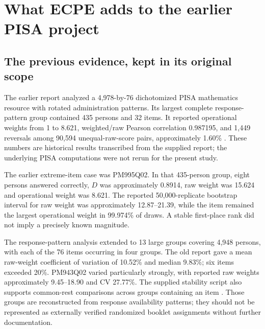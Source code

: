 \documentclass[11pt,a4paper,oneside,headings=normal,parskip=half]{scrreprt}
\begin{document}
\chapter{What ECPE adds to the earlier PISA project}
\section{The previous evidence, kept in its original scope}
The earlier report analyzed a 4,978-by-76 dichotomized PISA mathematics resource with rotated administration patterns. Its largest complete response-pattern group contained 435 persons and 32 items. It reported operational weights from 1 to 8.621, weighted/raw Pearson correlation 0.987195, and 1,449 reversals among 90,594 unequal-raw-score pairs, approximately 1.60\% \citep{oldreport}. These numbers are historical results transcribed from the supplied report; the underlying PISA computations were not rerun for the present study.

The earlier extreme-item case was PM995Q02. In that 435-person group, eight persons answered correctly, $D$ was approximately 0.8914, raw weight was 15.624 and operational weight was 8.621. The reported 50,000-replicate bootstrap interval for raw weight was approximately 12.87--21.39, while the item remained the largest operational weight in 99.974\% of draws. A stable first-place rank did not imply a precisely known magnitude.

The response-pattern analysis extended to 13 large groups covering 4,948 persons, with each of the 76 items occurring in four groups. The old report gave a mean raw-weight coefficient of variation of 10.52\% and median 9.83\%; six items exceeded 20\%. PM943Q02 varied particularly strongly, with reported raw weights approximately 9.45--18.90 and CV 27.77\%. The supplied stability script also supports common-rest comparisons across groups containing an item \citep{pisascript}. Those groups are reconstructed from response availability patterns; they should not be represented as externally verified randomized booklet assignments without further documentation.
\end{document}
